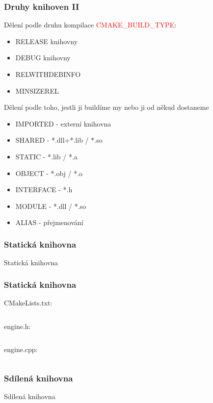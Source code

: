 \begin{frame}[fragile]
\frametitle{Druhy knihoven II}
Dělení podle druhu kompilace \textcolor{red}{CMAKE\_BUILD\_TYPE}:
	\begin{itemize}
	\item RELEASE knihovny
  \item DEBUG knihovny
  \item RELWITHDEBINFO
  \item MINSIZEREL
	\end{itemize}
Dělení podle toho, jestli ji buildíme my nebo ji od někud dostaneme
  \begin{itemize}
  \item IMPORTED - externí knihovna
  \item SHARED - *.dll+*.lib / *.so
  \item STATIC - *.lib / *.a
  \item OBJECT - *.obj / *.o
  \item INTERFACE - *.h
  \item MODULE - *.dll / *.so
  \item ALIAS - přejmenování
  \end{itemize}
\end{frame}

\begin{frame}
\frametitle{Statická knihovna}
\begin{center}
\Huge {\color{white}Statická knihovna}
\end{center}
\end{frame}

\begin{frame}[fragile]
\frametitle{Statická knihovna}
CMakeLists.txt:
{\scriptsize\inputminted[frame=lines]{cmake}{../examples/05-StaticLibrary/CMakeLists.txt}}
engine.h:
{\scriptsize\inputminted[frame=lines]{c++}{../examples/05-StaticLibrary/engine.h}}
engine.cpp:
{\scriptsize\inputminted[frame=lines]{c++}{../examples/05-StaticLibrary/engine.cpp}}
\end{frame}

\begin{frame}
\frametitle{Sdílená knihovna}
\begin{center}
\Huge {\color{white}Sdílená knihovna}
\end{center}
\end{frame}

